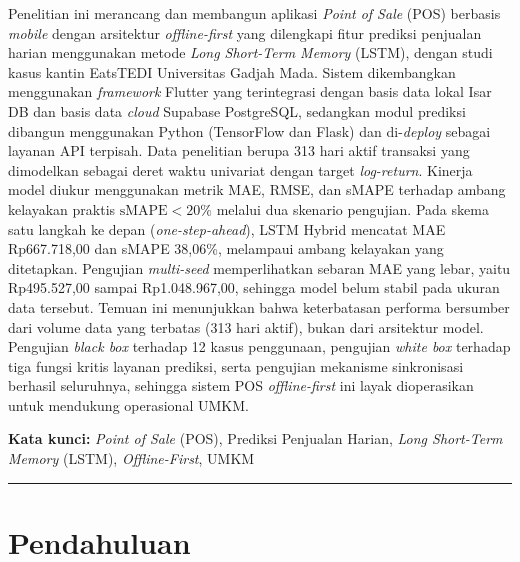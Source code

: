 \documentclass[10pt,a4paper]{article}
\begin{document}
{\fontsize{10pt}{13pt}\selectfont
Penelitian ini merancang dan membangun aplikasi \textit{Point of Sale} (POS) berbasis \textit{mobile} dengan arsitektur \textit{offline-first} yang dilengkapi fitur prediksi penjualan harian menggunakan metode \textit{Long Short-Term Memory} (LSTM), dengan studi kasus kantin EatsTEDI Universitas Gadjah Mada. Sistem dikembangkan menggunakan \textit{framework} Flutter yang terintegrasi dengan basis data lokal Isar DB dan basis data \textit{cloud} Supabase PostgreSQL, sedangkan modul prediksi dibangun menggunakan Python (TensorFlow dan Flask) dan di-\textit{deploy} sebagai layanan API terpisah. Data penelitian berupa 313 hari aktif transaksi yang dimodelkan sebagai deret waktu univariat dengan target \textit{log-return}. Kinerja model diukur menggunakan metrik MAE, RMSE, dan sMAPE terhadap ambang kelayakan praktis $\text{sMAPE} < 20\%$ melalui dua skenario pengujian. Pada skema satu langkah ke depan (\textit{one-step-ahead}), LSTM Hybrid mencatat MAE Rp667.718,00 dan sMAPE 38,06\%, melampaui ambang kelayakan yang ditetapkan. Pengujian \textit{multi-seed} memperlihatkan sebaran MAE yang lebar, yaitu Rp495.527,00 sampai Rp1.048.967,00, sehingga model belum stabil pada ukuran data tersebut. Temuan ini menunjukkan bahwa keterbatasan performa bersumber dari volume data yang terbatas (313 hari aktif), bukan dari arsitektur model. Pengujian \textit{black box} terhadap 12 kasus penggunaan, pengujian \textit{white box} terhadap tiga fungsi kritis layanan prediksi, serta pengujian mekanisme sinkronisasi berhasil seluruhnya, sehingga sistem POS \textit{offline-first} ini layak dioperasikan untuk mendukung operasional UMKM.\par}

\vspace{5pt}
{\fontsize{10pt}{12pt}\selectfont\textbf{Kata kunci:} \textit{Point of Sale} (POS), Prediksi Penjualan Harian, \textit{Long Short-Term Memory} (LSTM), \textit{Offline-First}, UMKM\par}

\vspace{4pt}
\noindent\rule{\textwidth}{0.4pt}
\vspace{6pt}

\section{Pendahuluan}
\end{document}
